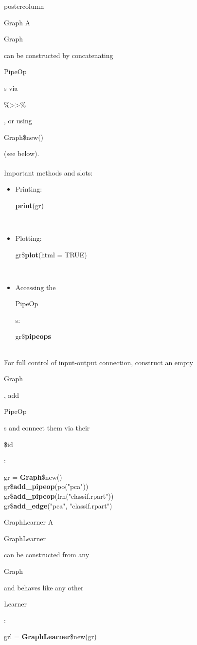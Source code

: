 \documentclass{beamer}
\newcommand{\codeinline}[1]{\begin{codeboxinline}#1\end{codeboxinline}}
\begin{document}
\begin{frame}[fragile]{}
\begin{columns}
\begin{column}{.245\textwidth}
\begin{beamercolorbox}[center]{postercolumn}
\begin{minipage}{.98\textwidth}
{\begin{myblock}{Graph}
              A \codeinline{Graph} can be constructed by concatenating \codeinline{PipeOp}s via \codeinline{\%>{}>\%}, or using \codeinline{Graph\$new()} (see below).\\
              \ \\
              Important methods and slots:
              \begin{itemize}
                \item Printing: \codeinline{\textbf{print}(gr)}\\
                \item Plotting: \codeinline{gr\$\textbf{plot}(html = TRUE)}\\
                \item Accessing the \codeinline{PipeOp}s: \codeinline{gr\$\textbf{pipeops}}
              \end{itemize}
              \ \\
              For full control of input-output connection, construct an empty \codeinline{Graph}, add \codeinline{PipeOp}s and connect them via their \codeinline{\$id}:
              \begin{codeboxmultiline}[width=23cm]
                gr = \textbf{Graph}\$new()\\
                gr\$\textbf{add\_pipeop}(po("pca"))\\
                gr\$\textbf{add\_pipeop}(lrn("classif.rpart"))\\
                gr\$\textbf{add\_edge}("pca", "classif.rpart")
              \end{codeboxmultiline}
            \end{myblock}
            \vspace{-0.5em}
            \begin{myblock}{GraphLearner}
              \vspace{-0.5em}
              A \codeinline{GraphLearner} can be constructed from any \codeinline{Graph} and behaves like any other \codeinline{Learner}: \codeinline{grl = \textbf{GraphLearner}\$new(gr)}\\

\end{myblock}}
\end{minipage}
\end{beamercolorbox}
\end{column}
\end{columns}
\end{frame}
\end{document}
